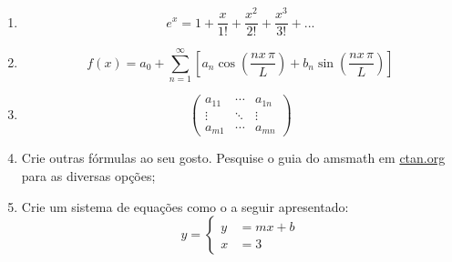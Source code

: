 \begin{enumerate}
\begin{enumerate}
\item
\begin{equation}
e^x=1+\frac{x}{1!}+\frac{x^2}{2!}+\frac{x^3}{3!}+...
\end{equation}

\item 
\begin{equation}
f(x)=a_0+\sum_{n=1}^\infty \left [ a_n \cos\left ( \frac{nx\,\pi}{L} \right ) + b_n \sin\left ( \frac{nx\,\pi}{L} \right ) \right ]
\end{equation}

\item 
\[
\begin{pmatrix}
 a_{11} & \cdots & a_{1n}\\ 
 \vdots & \ddots & \vdots\\ 
 a_{m1} & \cdots & a_{mn}
 \end{pmatrix}
\]

\item Crie outras fórmulas ao seu gosto. Pesquise o guia do amsmath em \url{ctan.org} para as diversas opções;

\item Crie um sistema de equações como o a seguir apresentado:
\begin{equation}
\hat{y} = \left \{
\begin{array}{ll}
y &= mx + b\\
x &= 3
\end{array}
\right .
\end{equation}

\end{enumerate}

\end{enumerate}

